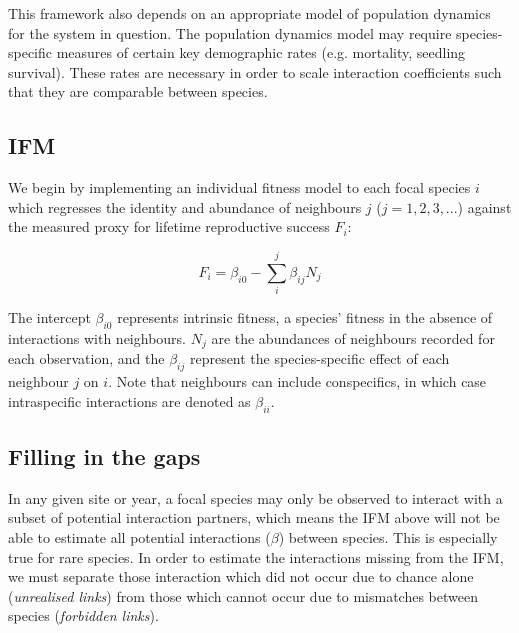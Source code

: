 \documentclass[a4,12pt]{article}
\begin{document}
    
    This framework also depends on an appropriate model of population dynamics for the system in question. The population dynamics model may require species-specific measures of certain key demographic rates (e.g. mortality, seedling survival). These rates are necessary in order to scale interaction coefficients such that they are comparable between species. 
    
    
    \subsection{IFM}
        
        We begin by implementing an individual fitness model to each focal species $i$ which regresses the identity and abundance of neighbours $j$ ($j = 1, 2, 3, ...$) against the measured proxy for lifetime reproductive success $F_{i}$:
        
        \begin{equation}
        F_{i} = \beta_{i0} - \sum_{i}^{j} \beta_{ij} N_{j}
        \label{ifm}
        \end{equation}
        
        The intercept $\beta_{i0}$ represents intrinsic fitness, a species' fitness in the absence of interactions with neighbours. $N_{j}$ are the abundances of neighbours recorded for each observation, and the $\beta_{ij}$ represent the species-specific effect of each neighbour $j$ on $i$. Note that neighbours can include conspecifics, in which case intraspecific interactions are denoted as $\beta_{ii}$.
              
    \subsection{Filling in the gaps}
        
        In any given site or year, a focal species may only be observed to interact with a subset of potential interaction partners, which means the IFM above will not be able to estimate all potential interactions ($\beta$) between species. This is especially true for rare species. In order to estimate the interactions missing from the IFM, we must separate those interaction which did not occur due to chance alone (\textit{unrealised links}) from those which cannot occur due to mismatches between species (\textit{forbidden links}). 
        
        
\end{document}
